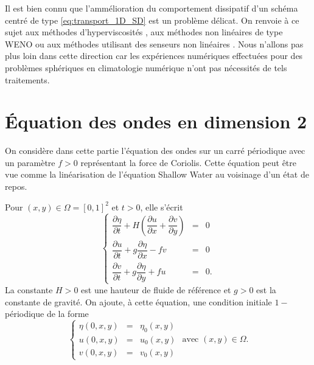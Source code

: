 Il est bien connu que l'ammélioration du comportement dissipatif d'un schéma centré de type \eqref{eq:transport_1D_SD} est un problème délicat. On renvoie à ce sujet aux méthodes d'hyperviscosités \cite{Cook2005}, aux méthodes non linéaires de type WENO \cite{Qiu2002} ou aux méthodes utilisant des senseurs non linéaires \cite{Yee1989}. Nous n'allons pas plus loin dans cette direction car les expériences numériques effectuées pour des problèmes sphériques en climatologie numérique n'ont pas nécessités de tels traitements.














































\section{Équation des ondes en dimension 2}

On considère dans cette partie l'équation des ondes sur un carré périodique avec un paramètre $f > 0$ représentant la force de Coriolis. Cette équation peut être vue comme la linéarisation de l'équation Shallow Water  au voisinage d'un état de repos.

Pour $(x,y) \in \Omega = [0,1]^2$ et $t>0$, elle s'écrit 
\begin{equation}
\left\lbrace
\begin{array}{rcl}
\dfrac{\partial \eta}{\partial t} + H \left( \dfrac{\partial u}{\partial x} + \dfrac{\partial v}{\partial y} \right) & = & 0 \\
\dfrac{\partial u}{\partial t} + g \dfrac{\partial \eta}{\partial x} - f v & = & 0 \\
\dfrac{\partial v}{\partial t} + g \dfrac{\partial \eta}{\partial y} + f u & = & 0.
\end{array}
\right.
\label{eq:ondes_2D}
\end{equation}
La constante $H>0$ est une hauteur de fluide de référence et $g>0$ est la constante de gravité.
On ajoute, à cette équation, une condition initiale $1-$périodique de la forme
\begin{equation}
\left\lbrace
\begin{array}{rcl}
\eta(0,x,y) & = & \eta_0(x,y)\\
u(0,x,y) & = & u_0(x,y)\\
v(0,x,y) & = & v_0(x,y)
\end{array}
\right. \text{ avec } (x,y) \in \Omega. 
\end{equation}


